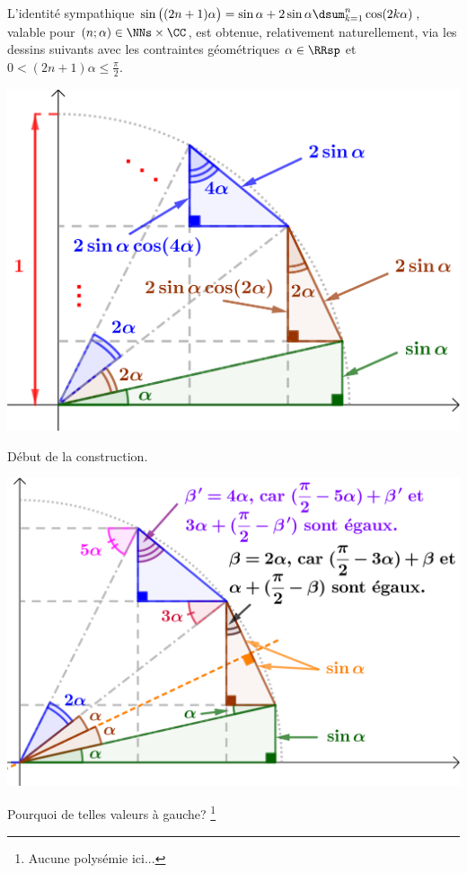 \begin{example}
    L'identité sympathique
    $ \sin \big( (2n+1) \alpha \big)
    = \sin \alpha
    + 2 \sin \alpha \dsum_{k=1}^{n} \cos ( 2k \alpha )$,
    valable pour $(n ; \alpha) \in \NNs \times \CC$,
    est obtenue, relativement naturellement, via les dessins suivants avec les contraintes géométriques
    $\alpha \in \RRsp$
    et
    $0 < (2n +1) \alpha \leq \frac{\pi}{2}$.
	
	
	\begin{multicols}{2}
	\small\itshape
	\begin{center}
		\includegraphics[scale=.75]{tricky-trigo-sum.png}
		
		\smallskip
		Début de la construction.

		\includegraphics[scale=.75]{tricky-trigo-sum-why.png}
		
		\smallskip
		Pourquoi de telles valeurs à gauche?%
		\footnote{
		    Aucune polysémie ici...
		}
	\end{center}
	\end{multicols}
\end{example}
